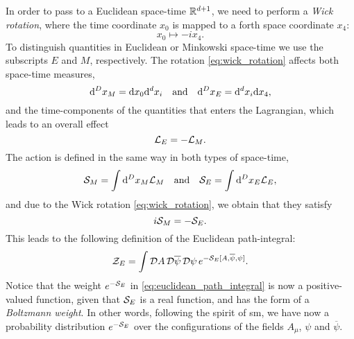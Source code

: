 In order to pass to a Euclidean space-time $\mathbb{R}^{d+1}$, we need to perform a \emph{Wick rotation},
where the time coordinate $x_0$ is mapped to a forth space coordinate $x_4$:
\begin{equation*}
    x_0 \mapsto - i x_4.
    \label{eq:wick_rotation}
\end{equation*}
To distinguish quantities in Euclidean or Minkowski space-time we use the subscripts $E$ and $M$, respectively.
The rotation \eqref{eq:wick_rotation} affects both space-time measures,
\begin{equation*}
    \dd^D x_M = \dd x_0 \dd^d x_i \qand
    \dd^D x_E = \dd^d x_i \dd x_4,
\end{equation*}
and the time-components of the quantities that enters the Lagrangian, which leads to an overall effect
\begin{equation*}
    \mathcal{L}_E = - \mathcal{L}_M.
\end{equation*}
The action is defined in the same way in both types of space-time,
\begin{equation*}
    \Action_M = \int \dd^D x_M \Lagrangian_M
    \qand
    \Action_E = \int \dd^D x_E \Lagrangian_E,
\end{equation*}
and due to the Wick rotation \eqref{eq:wick_rotation}, we obtain that they satisfy
\begin{equation}
    i \mathcal{S}_M = - \mathcal{S}_E.
\end{equation}
This leads to the following definition of the Euclidean path-integral:
\begin{equation}
    \mathcal{Z}_E = \int \mathcal{D} A\, \mathcal{D} \overline{\psi}\, \mathcal{D} \psi\, e^{-\mathcal{S}_E[A, \overline{\psi}, \psi]}.
    \label{eq:euclidean_path_integral}
\end{equation}
Notice that the weight $e^{-\mathcal{S}_E}$ in \eqref{eq:euclidean_path_integral} is now a positive-valued function, given that $\mathcal{S}_E$ is a real function, and has the form of a \emph{Boltzmann weight}.
In other words, following the spirit of \ac{sm}, we have now a probability distribution $e^{- \mathcal{S}_E}$ over the configurations of the fields $A_{\mu}$, $\psi$ and $\overline{\psi}$.



